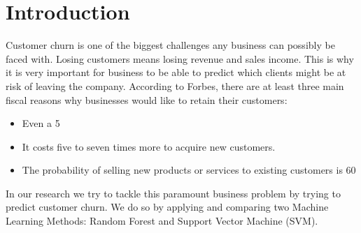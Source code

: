 \section{Introduction}\label{introduction}


Customer churn is one of the biggest challenges any business can possibly be faced with. Losing customers means losing revenue and sales income. This is why it is very important for business to be able to predict which clients might be at risk of leaving the company. 
According to Forbes, there are at least three main fiscal reasons why businesses would like to retain their customers:

\begin{itemize}
  \item Even a 5%
  \item It costs five to seven times more to acquire new customers.
  \item The probability of selling new products or services to existing customers is 60%
\end{itemize}


In our research we try to tackle this paramount business problem by trying to predict customer churn. We do so by applying and comparing two Machine Learning Methods: Random Forest and Support Vector Machine (SVM).
